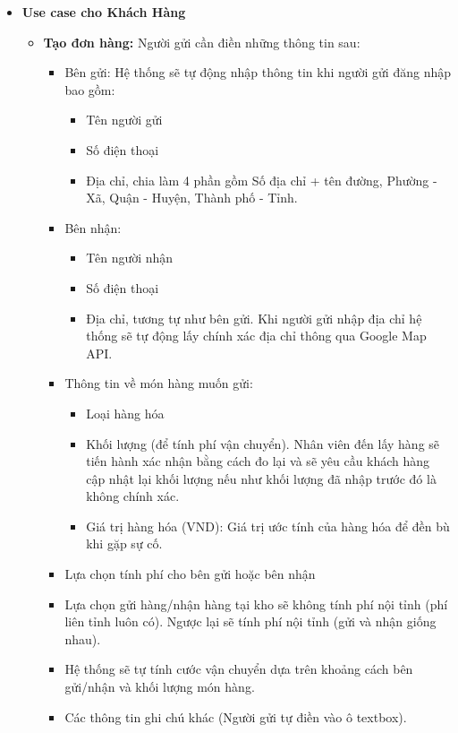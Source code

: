 	\begin{itemize}
		\item \textbf{Use case cho Khách Hàng}
		\begin{itemize}
			\item \textbf{Tạo đơn hàng:} Người gửi cần điền những thông tin sau: 
			\begin{itemize}
				\item Bên gửi: Hệ thống sẽ tự động nhập thông tin khi người gửi đăng nhập bao gồm:
				\begin{itemize}
					\item Tên người gửi
					\item Số điện thoại
					\item Địa chỉ, chia làm 4 phần gồm Số địa chỉ + tên đường, Phường - Xã, Quận - Huyện, Thành phố - Tỉnh. 
				\end{itemize}
				\item Bên nhận:
				\begin{itemize}
					\item Tên người nhận
					\item Số điện thoại
					\item Địa chỉ, tương tự như bên gửi. Khi người gửi nhập địa chỉ hệ thống sẽ tự động lấy chính xác địa chỉ thông qua Google Map API.
				\end{itemize}
				\item Thông tin về món hàng muốn gửi:
				\begin{itemize}
					\item Loại hàng hóa
					\item Khối lượng (để tính phí vận chuyển). Nhân viên đến lấy hàng sẽ tiến hành xác nhận bằng cách đo lại và sẽ yêu cầu khách hàng cập nhật lại khối lượng nếu như khối lượng đã nhập trước đó là không chính xác.
					\item Giá trị hàng hóa (VND): Giá trị ước tính của hàng hóa để đền bù khi gặp sự cố.
					
				\end{itemize}
				\item Lựa chọn tính phí cho bên gửi hoặc bên nhận 
				\item Lựa chọn gửi hàng/nhận hàng tại kho sẽ không tính phí nội tỉnh (phí liên tỉnh luôn có). Ngược lại sẽ tính phí nội tỉnh (gửi và nhận giống nhau). 
				\item Hệ thống sẽ tự tính cước vận chuyển dựa trên khoảng cách bên gửi/nhận và khối lượng món hàng.
				\item Các thông tin ghi chú khác (Người gửi tự điền vào ô textbox).
			\end{itemize} 
				

\end{itemize}
\end{itemize}
